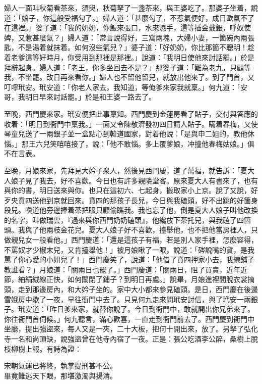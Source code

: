 婦人一面叫秋菊看茶來，須臾，秋菊拏了一盞茶來，與王婆吃了。那婆子坐着，說道：「娘子，你這般受福勾了。」{}婦人道：「甚麼勾了，不惹氣便好，成日歐氣不了在這裡。」婆子道：「我的奶奶，你飯來張口，水來濕手，這等插金戴銀，呼奴使婢，又惹甚麼氣？」婦人道：「常言說得好，三窩兩塊，大婦小妻，一箇碗內兩張匙，不是湯着就抹着。如何沒些氣兒？」婆子道：「好奶奶，你比那箇不聰明！趁着老爹這等好時月，你受用到那裡是那裡。」說道：「我明日使他來討話罷。」於是拜辭起身。婦人道：「老王，你多坐回去不是？」那婆子道：「難為老九，只顧等我，不坐罷。改日再來看你。」婦人也不留他留兒，就放出他來了。到了門首，又叮嚀玳安。玳安道：「你老人家去，我知道，等俺爹來家我就稟。」何九道：「安哥，我明日早來討話罷。」於是和王婆一路去了。

至晚，西門慶來家。玳安便把此事稟知。西門慶到金蓮房看了貼子，交付與答應的收着：「明日到衙門中稟我。」一面又令陳敬濟發初四日請人貼子。瞞着春梅，又使琴童兒送了一兩銀子並一盒點心到韓道國家，對着他說：「是與申二姐的，教他休惱。」那王六兒笑嘻嘻接了，說：「他不敢惱。多上覆爹娘，冲撞他春梅姑娘。」俱不在言表。

至晚，月娘來家，先拜見大妗子衆人，然後見西門慶，道了萬福，就告訴：「夏大人娘子見了我去，好不喜歡。今日也有許多親隣堂客。原來夏大人有書來了，也有與你的書，明日送來與你。{}也只在這初六、七起身，搬取家小上京。說了又說，好歹央賁四送他到京就回來。賁四的那孩子長兒，今日與我磕頭，好不出跳的好箇身段兒。嗔道他旁邊捧着茶把眼只顧偷瞧我。我也忘了他，倒是夏大人娘子叫他改換的名字，叫做瑞雲，『過來與你西門奶奶磕頭』，他纔放下茶托兒，與我磕了四箇頭。我與了他兩枝金花兒。夏大人娘子好不喜歡，擡舉他，也不把他當房裡人，只做親兒女一般看他。」西門慶道：「還是這孩子有福，若是別人家手裡，怎麼容得，不罵奴才少椒末兒，又肯擡舉他！」{}被月娘瞅了一眼，說道：「硶說嘴的貨，是我罵了你心愛的小姐兒了！」西門慶笑了，說道：「他借了賁四押家小去，我線鋪子教誰看？」月娘道：「關兩日也罷了。」西門慶道：「關兩日，阻了買賣，近年近節，紬絹絨線正快，如何關閉了鋪子？到明日再處。」說畢，月娘進裡間脫衣裳摘頭，走到那邊房內，和大妗子坐的。家中大小都來參見磕頭。是日，西門慶在後邊雪娥房中歇了一夜，早往衙門中去了。只見何九走來問玳安討信，與了玳安一兩銀子。玳安道：「昨日爹來家，就替你說了。今日到衙門中，敢就開出你兄弟來了。你往衙門首伺候。」何九聽言，滿心歡喜，一直走到衙門前去了。西門慶到衙門中坐廳，提出強盜來，每人又是一夾，二十大板，把何十開出來，放了。另拏了弘化寺一名和尚頂缺，說強盜曾在他寺內宿了一夜。{}正是：張公吃酒李公醉，桑樹上脫枝柳樹上報。有詩為證：

\begin{myquote} 
宋朝氣運已將終，執掌提刑甚不公。\\畢竟難逃天下眼，那堪激濁與揚清。
\end{myquote} 

